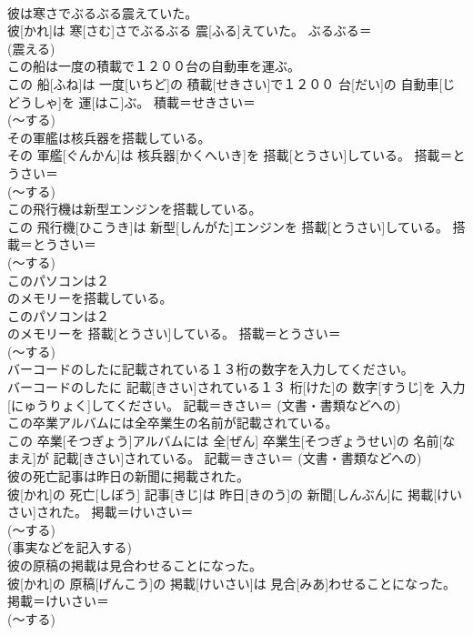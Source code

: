 \documentclass[8pt]{extreport}
\begin{document}
\begin{CJK}{UTF8}{min}
{\\	彼は寒さでぶるぶる震えていた。	
\\	彼[かれ]は 寒[さむ]さでぶるぶる 震[ふる]えていた。	ぶるぶる＝ 
\\	(震える)
\\	この船は一度の積載で１２００台の自動車を運ぶ。	
\\	この 船[ふね]は 一度[いちど]の 積載[せきさい]で１２００ 台[だい]の 自動車[じどうしゃ]を 運[はこ]ぶ。	積載＝せきさい＝ 
\\	(〜する) 
\\	その軍艦は核兵器を搭載している。	
\\	その 軍艦[ぐんかん]は 核兵器[かくへいき]を 搭載[とうさい]している。	搭載＝とうさい＝ 
\\	(〜する) 
\\	この飛行機は新型エンジンを搭載している。	
\\	この 飛行機[ひこうき]は 新型[しんがた]エンジンを 搭載[とうさい]している。	搭載＝とうさい＝ 
\\	(〜する) 
\\	このパソコンは２
\\	のメモリーを搭載している。	
\\	このパソコンは２ 
\\	のメモリーを 搭載[とうさい]している。	搭載＝とうさい＝ 
\\	(〜する) 
\\	バーコードのしたに記載されている１３桁の数字を入力してください。	
\\	バーコードのしたに 記載[きさい]されている１３ 桁[けた]の 数字[すうじ]を 入力[にゅうりょく]してください。	記載＝きさい＝ (文書・書類などへの) 
\\	この卒業アルバムには全卒業生の名前が記載されている。	
\\	この 卒業[そつぎょう]アルバムには 全[ぜん] 卒業生[そつぎょうせい]の 名前[なまえ]が 記載[きさい]されている。	記載＝きさい＝ (文書・書類などへの) 
\\	彼の死亡記事は昨日の新聞に掲載された。	
\\	彼[かれ]の 死亡[しぼう] 記事[きじ]は 昨日[きのう]の 新聞[しんぶん]に 掲載[けいさい]された。	掲載＝けいさい＝ 
\\	(〜する) 
\\	(事実などを記入する) 
\\	彼の原稿の掲載は見合わせることになった。	
\\	彼[かれ]の 原稿[げんこう]の 掲載[けいさい]は 見合[みあ]わせることになった。	掲載＝けいさい＝ 
\\	(〜する) 
}
\end{CJK}
\end{document}
